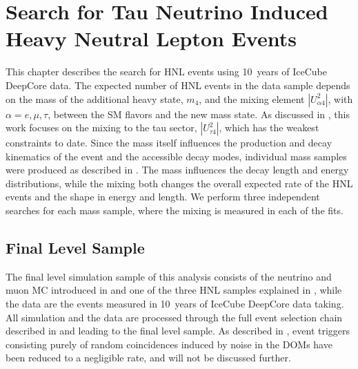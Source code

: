 \setchapterpreamble[u]{\margintoc}

\chapter{Search for Tau Neutrino Induced Heavy Neutral Lepton Events}

This chapter describes the search for HNL events using \SI{10}{years} of IceCube DeepCore data. The expected number of HNL events in the data sample depends on the mass of the additional heavy state, $m_4$, and the mixing element $|U_{\alpha4}^2|$, with $\alpha=e,\mu,\tau$, between the SM flavors and the new mass state. As discussed in , this work focuses on the mixing to the tau sector, $|U_{\tau4}^2|$, which has the weakest constraints to date.
Since the mass itself influences the production and decay kinematics of the event and the accessible decay modes, individual mass samples were produced as described in . The mass influences the decay length and energy distributions, while the mixing both changes the overall expected rate of the HNL events and the shape in energy and length.
We perform three independent searches for each mass sample, where the mixing is measured in each of the fits.


\section{Final Level Sample} 

The final level simulation sample of this analysis consists of the neutrino and muon MC introduced in  and one of the three HNL samples explained in , while the data are the events measured in \SI{10}{years} of IceCube DeepCore data taking. All simulation and the data are processed through the full event selection chain described in  and  leading to the final level sample. As described in , event triggers consisting purely of random coincidences induced by noise in the DOMs have been reduced to a negligible rate, and will not be discussed further.

